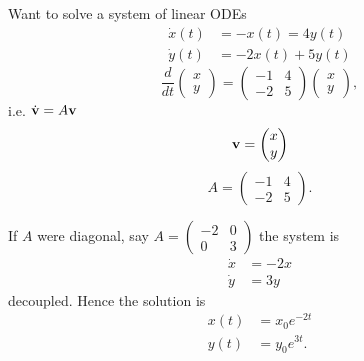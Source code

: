 \documentclass[10pt, a4paper]{article}
\begin{document}
\begin{example}
    Want to solve a system of linear ODEs
    \begin{align*}
        \dot{x}(t) &= -x(t) = 4y(t) \\
        \dot{y}(t) &= -2x(t) + 5y(t)
    \end{align*}
    \[
    \frac{d}{dt}\begin{pmatrix}
        x \\ y
    \end{pmatrix}
    =
    \begin{pmatrix}
        -1 & 4 \\ -2 & 5
    \end{pmatrix}
    \begin{pmatrix}
        x \\ y
    \end{pmatrix},
    \]
    i.e.
    $\dot{\mathbf{v}} = A\mathbf{v}$
    \[
    \mathbf{v} = \begin{pmatrix}
        x \\ y
    \end{pmatrix}
    \]
    \[
    A = \begin{pmatrix}
        -1 & 4 \\ -2 & 5
    \end{pmatrix}.
    \]

    If $A$ were diagonal,
    say $A = \begin{pmatrix}
        -2 & 0 \\ 0 & 3
    \end{pmatrix}$
    the system is
    \begin{align*}
        \dot{x} &= -2x \\
        \dot{y} &= 3y
    \end{align*}
    decoupled.
    Hence the solution is
    \begin{align*}
        x(t) &= x_0e ^ {-2t} \\
        y(t) &= y_0e ^ {3t}.
    \end{align*}
\end{example}
\end{document}
